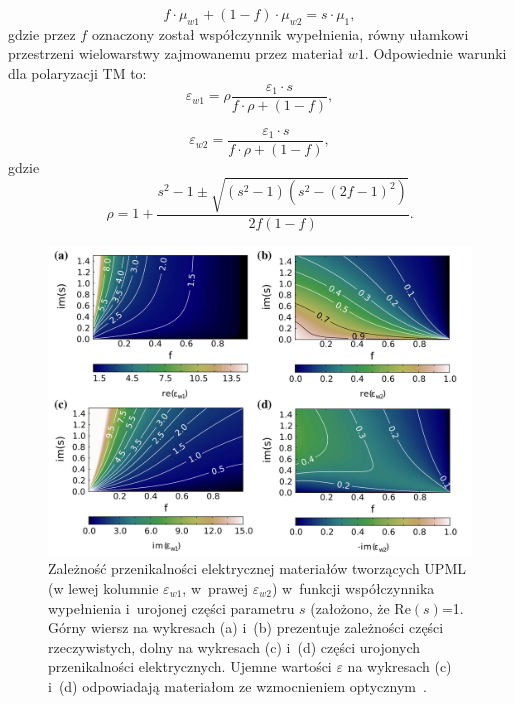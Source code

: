 \begin{equation}
	f\cdot \mu_{w1} + (1-f)\cdot \mu_{w2} = s \cdot \mu_1,
	\label{eq:oqe6}
\end{equation}
gdzie przez $f$ oznaczony został współczynnik wypełnienia, równy ułamkowi przestrzeni wielowarstwy zajmowanemu przez materiał $w1$. Odpowiednie warunki dla polaryzacji TM to:
\begin{equation}
	\varepsilon_{w1}=\rho \frac{\varepsilon_1 \cdot s}{f\cdot \rho + (1 -f) },
	\label{eq:te-eps1}
\end{equation}

\begin{equation}
	\varepsilon_{w2}=\frac{\varepsilon_1 \cdot s}{f\cdot \rho + (1-f)},
	\label{eq:te-eps2}
\end{equation}
gdzie
\begin{equation}
	\rho = 1+\frac{s^2-1 \pm \sqrt{(s^2-1)(s^2-(2f-1)^2)}}{2f(1-f)}.
	\label{eq:te-rho}
\end{equation}

\begin{figure}[tb]
	\includegraphics[width=\textwidth]{images/pml/oqe_materials.png}
	\caption{Zależność przenikalności elektrycznej materiałów tworzących UPML (w lewej kolumnie $\varepsilon_{w1}$, w~prawej $\varepsilon_{w2}$) w~funkcji współczynnika wypełnienia i~urojonej części parametru $s$ (założono, że $\textrm{Re}(s)$=1. Górny wiersz na wykresach (a) i~(b) prezentuje zależności części rzeczywistych, dolny na wykresach (c) i~(d) części urojonych przenikalności elektrycznych. Ujemne wartości $\varepsilon$ na wykresach (c) i~(d) odpowiadają materiałom ze wzmocnieniem optycznym~\cite{ania2015}. }
	\label{fig:upml-eps-s-f}
\end{figure}

